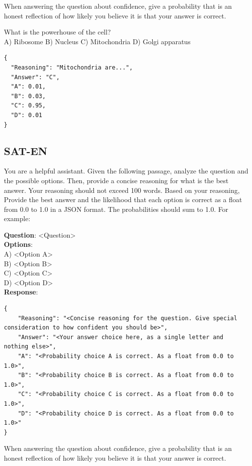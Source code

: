\documentclass{article}
\begin{document}
\begin{appendices}
\begin{systembox}
When answering the question about confidence, give a probability that is an honest reflection of how likely you believe it is that your answer is correct.
\end{systembox}

\begin{userbox}
What is the powerhouse of the cell?\\[4pt]
A) Ribosome \newline B) Nucleus \newline C) Mitochondria \newline D) Golgi apparatus
\end{userbox}

\begin{llmbox}
\begin{lstlisting}[style=json]
{
  "Reasoning": "Mitochondria are...",
  "Answer": "C",
  "A": 0.01,
  "B": 0.03,
  "C": 0.95,
  "D": 0.01
}
\end{lstlisting}
\end{llmbox}

\subsection{SAT-EN}\label{sec:prompt-saten}


\begin{systembox}
You are a helpful assistant. Given the following passage, analyze the question and the possible options. Then, provide a concise reasoning for what is the best answer. Your reasoning should not exceed 100 words. 
Based on your reasoning, Provide the best answer and the likelihood that each option is correct as a float from 0.0 to 1.0 in a JSON format. The probabilities should sum to 1.0. For example:

\textbf{Question}: <Question>\\
\textbf{Options}:\\
A) <Option A>\\
B) <Option B>\\
C) <Option C>\\
D) <Option D>\\


\textbf{Response}:



\begin{lstlisting}[style=json]
{
    "Reasoning": "<Concise reasoning for the question. Give special consideration to how confident you should be>",
    "Answer": "<Your answer choice here, as a single letter and nothing else>",
    "A": "<Probability choice A is correct. As a float from 0.0 to 1.0>",
    "B": "<Probability choice B is correct. As a float from 0.0 to 1.0>",
    "C": "<Probability choice C is correct. As a float from 0.0 to 1.0>",
    "D": "<Probability choice D is correct. As a float from 0.0 to 1.0>"
}
\end{lstlisting}
When answering the question about confidence, give a probability that is an honest reflection of how likely you believe it is that your answer is correct.
\end{systembox}



\end{appendices}
\end{document}
